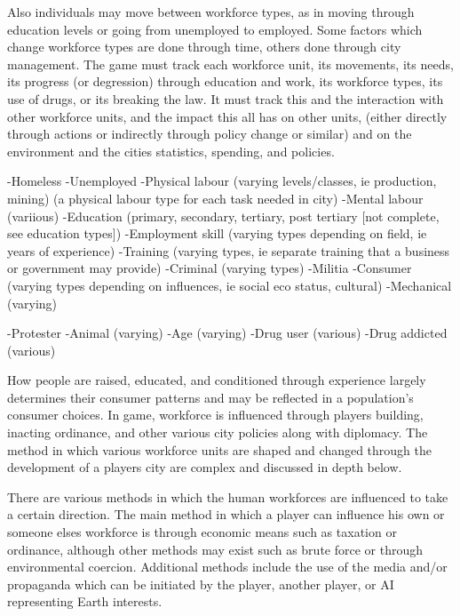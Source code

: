 Also individuals may move between workforce types, as in moving through education levels or going from unemployed to employed. Some factors which change workforce types are done through time, others done through city management. The game must track each workforce unit, its movements, its needs, its progress (or degression) through education and work, its workforce types, its use of drugs, or its breaking the law. It must track this and the interaction with other workforce units, and the impact this all has on other units, (either directly through actions or indirectly through policy change or similar) and on the environment and the cities statistics, spending, and policies.


-Homeless
-Unemployed
-Physical labour (varying levels/classes, ie production, mining)
	(a physical labour type for each task needed in city) 
-Mental labour (variious)
-Education (primary, secondary, tertiary, post tertiary [not complete, see education types])
-Employment skill (varying types depending on field, ie years of experience)
-Training (varying types, ie separate training that a business or government may provide)
-Criminal (varying types)
-Militia
-Consumer (varying types depending on influences, ie social eco status, cultural)
-Mechanical (varying) 

-Protester
-Animal (varying)
-Age (varying)
-Drug user (various)
-Drug addicted (various)










%
How people are raised, educated, and conditioned through experience largely determines their consumer patterns and may be reflected in a population's consumer choices. In game, workforce is influenced through players building, inacting ordinance, and other various city policies along with diplomacy. The method in which various workforce units are shaped and changed through the development of a players city are complex and discussed in depth below.
%

There are various methods in which the human workforces are influenced to take a certain direction. The main method in which a player can influence his own or someone elses workforce is through economic means such as taxation or ordinance, although other methods may exist such as brute force or through environmental coercion. Additional methods include the use of the media and/or propaganda which can be initiated by the player, another player, or AI representing Earth interests.

